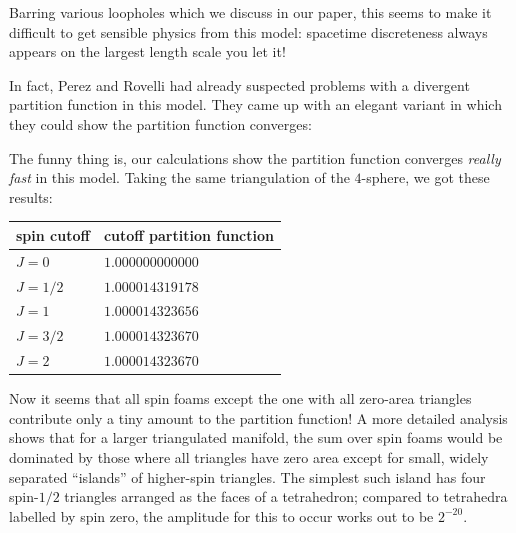 \documentclass{article}
\renewcommand{\texttt}[1]{%
  \begingroup
  \ttfamily
  \begingroup\lccode`~=`/\lowercase{\endgroup\def~}{/\discretionary{}{}{}}%
  \begingroup\lccode`~=`[\lowercase{\endgroup\def~}{[\discretionary{}{}{}}%
  \begingroup\lccode`~=`.\lowercase{\endgroup\def~}{.\discretionary{}{}{}}%
  \catcode`/=\active\catcode`[=\active\catcode`.=\active
  \scantokens{#1\noexpand}%
  \endgroup
}
\begin{document}
Barring various loopholes which we discuss in our paper, this seems to
make it difficult to get sensible physics from this model: spacetime
discreteness always appears on the largest length scale you let it!

In fact, Perez and Rovelli had already suspected problems with a
divergent partition function in this model. They came up with an elegant
variant in which they could show the partition function converges:


The funny thing is, our calculations show the partition function
converges \emph{really fast} in this model. Taking the same
triangulation of the \(4\)-sphere, we got these results:

\begin{longtable}[]{@{}ll@{}}
\toprule
spin cutoff & cutoff partition function\tabularnewline
\midrule
\endhead
\(J = 0\) & \(1.000000000000\)\tabularnewline
\(J = 1/2\) & \(1.000014319178\)\tabularnewline
\(J = 1\) & \(1.000014323656\)\tabularnewline
\(J = 3/2\) & \(1.000014323670\)\tabularnewline
\(J = 2\) & \(1.000014323670\)\tabularnewline
\bottomrule
\end{longtable}

Now it seems that all spin foams except the one with all zero-area
triangles contribute only a tiny amount to the partition function! A
more detailed analysis shows that for a larger triangulated manifold,
the sum over spin foams would be dominated by those where all triangles
have zero area except for small, widely separated ``islands'' of
higher-spin triangles. The simplest such island has four spin-\(1/2\)
triangles arranged as the faces of a tetrahedron; compared to tetrahedra
labelled by spin zero, the amplitude for this to occur works out to be
\(2^{-20}\).
\end{document}
